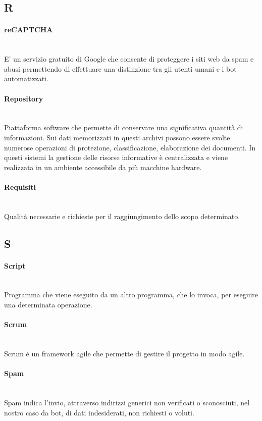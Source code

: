 \newpage
{}
\subsection*{R}
\paragraph{reCAPTCHA}~\smallskip \\
E' un servizio gratuito di Google che consente di proteggere i siti web da spam e abusi permettendo di effettuare una distinzione tra gli utenti umani e i bot automatizzati.

\paragraph{Repository}~\smallskip \\
Piattaforma software che permette di conservare una significativa quantità di informazioni. Sui dati memorizzati in questi archivi possono essere svolte numerose operazioni di protezione, classificazione, elaborazione dei documenti. In questi sistemi la gestione delle risorse informative è centralizzata e viene realizzata in un ambiente accessibile da più macchine hardware.

\paragraph{Requisiti}~\smallskip \\
Qualità necessarie e richieste per il raggiungimento dello scopo determinato.
\newpage
{}
\subsection*{S}
\paragraph{Script}~\smallskip \\
Programma che viene eseguito da un altro programma, che lo invoca, per eseguire una determinata operazione.

\paragraph{Scrum}~\smallskip \\
Scrum è un framework agile che permette di gestire il progetto in modo agile.

\paragraph{Spam}~\smallskip \\
Spam indica l'invio, attraverso indirizzi generici non verificati o sconosciuti, nel nostro caso da bot, di dati indesiderati, non richiesti o voluti.

